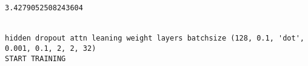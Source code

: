 \documentclass[11pt]{article}
\begin{document}
    \begin{center}
    \end{center}
    { \hspace*{\fill} \\}
    
    \begin{center}
    \end{center}
    { \hspace*{\fill} \\}
    
    \begin{center}
    \end{center}
    { \hspace*{\fill} \\}
    
    \begin{center}
    \end{center}
    { \hspace*{\fill} \\}
    
    \begin{Verbatim}[commandchars=\\\{\}]
3.4279052508243604


hidden dropout attn leaning weight layers batchsize (128, 0.1, 'dot', 0.001, 0.1, 2, 2, 32)
START TRAINING



    \end{Verbatim}

    \begin{center}
    \end{center}
    { \hspace*{\fill} \\}
    
    \begin{center}
    \end{center}
    { \hspace*{\fill} \\}
    
    \begin{center}
    \end{center}
    { \hspace*{\fill} \\}
    
\end{document}
